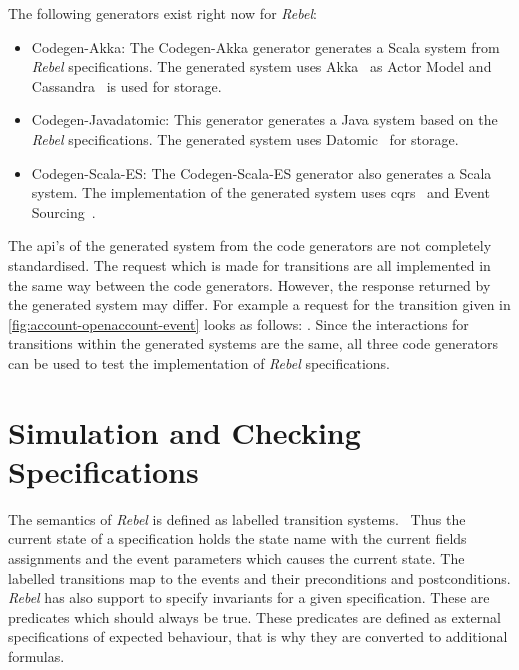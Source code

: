 The following generators exist right now for \textit{Rebel}:
\begin{itemize}

\item Codegen-Akka: The Codegen-Akka generator generates a Scala system from
\textit{Rebel} specifications. The generated system uses
Akka~\cite[p.~4]{roestenburg2016akka} as Actor Model and
Cassandra~\cite{lakshman2010cassandra} is used for storage.

\item Codegen-Javadatomic: This generator generates a Java system based on the
\textit{Rebel} specifications. The generated system uses
Datomic~\cite[p.~170-172]{anderson2016professional} for storage.

\item Codegen-Scala-ES: The Codegen-Scala-ES generator also generates a Scala
system. The implementation of the generated system uses
\gls{cqrs}~\cite{fowler2011cqrs} and Event Sourcing~\cite{fowler2005event}.

\end{itemize}

The \gls{api}'s of the generated system from the code generators are not completely
standardised. The request which is made for transitions are all implemented in
the same way between the code generators. However, the response returned by the
generated system may differ. For example a request for the transition given in
\autoref{fig:account-openaccount-event} looks as follows:
. Since the
interactions for transitions within the generated systems are the same, all
three code generators can be used to test the implementation of \textit{Rebel}
specifications.

\section{Simulation and Checking Specifications}


The semantics of \textit{Rebel} is defined as labelled transition
systems.~\cite[p.~5]{stoel_storm_vinju_bosman_2016} Thus the current state of a
specification holds the state name with the current fields assignments and the
event parameters which causes the current state. The labelled transitions map
to the events and their preconditions and postconditions. \textit{Rebel} has
also support to specify invariants for a given specification. These are
predicates which should always be true. These predicates are defined as external
specifications of expected behaviour, that is why they are converted to
additional formulas.

